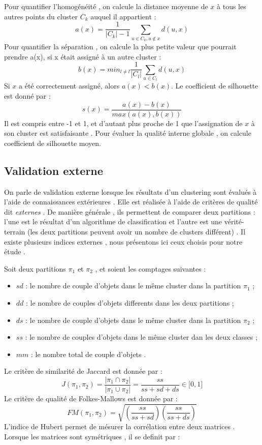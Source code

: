 \documentclass[11pt, openany]{report}
\begin{document}
Pour quantifier l'homogénéité ,  on calcule la distance moyenne de $x$ à tous les autres points du cluster $C_k$ auquel il appartient : 
\[
	\mathit{a(x)} = \frac{1}{ |C_k| - 1 }\sum_{ u \in C_k , u \not\in x}d(u,x)
\]
Pour quantifier la séparation , on calcule la plus petite valeur que pourrait prendre a(x), si x était assigné à un autre cluster :
\[	
	\mathit{b(x)} =  min_{\mathit{ l \neq l } } \frac{1}{|C_l|} \sum_{u \in C_l}d(u,x) 
\]
 Si $x$ a été correctement assigné, alors $a(x) < b(x)$. Le coefficient de silhouette est donné par :
\[	
	\mathit{s(x)} = \frac{ a(x) - b(x) }{ max ( a(x) , b(x) )} 
\]
Il est  compris entre -1 et 1, et d'autant plus proche de 1 que l'assignation de $x$ à son cluster est satisfaisante . Pour évaluer la qualité interne globale , on calcule coefficient de silhouette moyen.

\subsection{Validation externe}
On parle de validation externe lorsque les résultats d’un clustering sont évalués à l'aide de connaissances extérieures . Elle est réalisée à l'aide de critères de qualité dit \emph{externes} . De manière générale , ils permettent de comparer deux partitions  : l'une est le résultat d'un algorithme de classification et l'autre est une vérité-terrain (les deux partitions peuvent avoir un nombre de clusters différent) . Il existe plusieurs indices externes , nous présentons ici ceux choisis pour notre étude .

Soit deux partitions $\pi_1$  et $\pi_2$ , et soient les comptages suivantes :
\begin{itemize}
  \item $sd$ : le nombre de couple d'objets dans le même cluster dans la partition $\pi_1$ ;
   \item $dd$ : le nombre  de couples d'objets differents dans les deux partitions ;
    \item $ds$ : le nombre de couple d'objets dans le même cluster dans la partition $\pi_2$ ;
     \item $ss$ : le nombre de couples d'objets dans le même cluster dan les deux classes ;
     \item $mm$ : le nombre total de couple d'objets . \\
\end{itemize}
Le critère de similarité de Jaccard est donnée par :
\[
	J(\pi_1 , \pi_2 )= \frac{|\pi_1 \cap \pi_2|}{|\pi_1 \cup \pi_2|} = \frac{ss}{ss + sd + ds} \in \lbrack 0 , 1 \rbrack
\]
Le critère de qualité de Folkes-Mallows est  donnée par :
\[
	FM(\pi_1 , \pi_2 ) = \sqrt{ \left( \frac{ss}{ss + sd} \right) \left(\frac{ss}{ss + ds} \right) } 
\]
L'indice de Hubert  permet de mésurer la corrélation entre deux matrices \cite{R} . Lorsque les matrices sont symétriques , il se definit par  :
\end{document}
